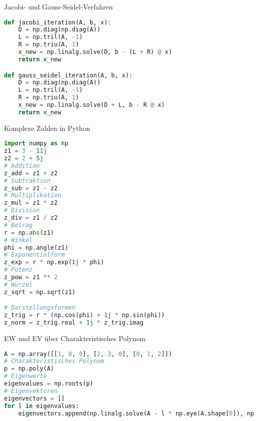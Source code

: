\begin{examplecode}{Jacobi- und Gauss-Seidel-Verfahren}
\begin{lstlisting}[language=Python, style=basesmol]
def jacobi_iteration(A, b, x):
    D = np.diag(np.diag(A))
    L = np.tril(A, -1)
    R = np.triu(A, 1)
    x_new = np.linalg.solve(D, b - (L + R) @ x)
    return x_new

def gauss_seidel_iteration(A, b, x):
    D = np.diag(np.diag(A))
    L = np.tril(A, -1)
    R = np.triu(A, 1)
    x_new = np.linalg.solve(D + L, b - R @ x)
    return x_new
\end{lstlisting}
\end{examplecode}

\begin{examplecode}{Komplexe Zahlen in Python}
\begin{lstlisting}[language=Python, style=basesmol]
import numpy as np
z1 = 3 - 11j
z2 = 2 + 5j
# Addition
z_add = z1 + z2
# Subtraktion
z_sub = z1 - z2
# Multiplikation
z_mul = z1 * z2
# Division
z_div = z1 / z2
# Betrag
r = np.abs(z1)
# Winkel
phi = np.angle(z1)
# Exponentialform
z_exp = r * np.exp(1j * phi)
# Potenz
z_pow = z1 ** 2
# Wurzel
z_sqrt = np.sqrt(z1)

# Darstellungsformen
z_trig = r * (np.cos(phi) + 1j * np.sin(phi))
z_norm = z_trig.real + 1j * z_trig.imag
\end{lstlisting}
\end{examplecode}

\begin{examplecode}{EW und EV über Charakteristisches Polynom}
\begin{lstlisting}[language=Python, style=basesmol]
A = np.array([[1, 0, 0], [2, 3, 0], [0, 1, 2]])
# Charakteristisches Polynom
p = np.poly(A)
# Eigenwerte
eigenvalues = np.roots(p)
# Eigenvektoren
eigenvectors = []
for l in eigenvalues:
    eigenvectors.append(np.linalg.solve(A - l * np.eye(A.shape[0]), np.zeros(A.shape[0])))
\end{lstlisting}
\end{examplecode}